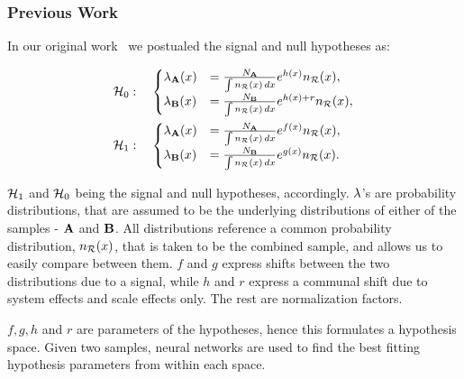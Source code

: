 \documentclass[../../ddppaper2.tex]{subfiles}
\begin{document}
\subsubsection{Previous Work}

In our original work~\cite{LastDDPPaper} we postualed the signal and null hypotheses as:

\begin{equation}
\begin{aligned}
    \nullhypothesis &: \quad
    \begin{cases}
        \pdf_{\dataset{A}}(\eventsymbol)
        &=
        \frac{N_{\dataset{A}}}
            {\int \refdist[\eventsymbol]\,d\eventsymbol}
        e^{h(\eventsymbol)} \refdist[\eventsymbol],
        \\
        \pdf_{\dataset{B}}(\eventsymbol)
        &=
        \frac{N_{\dataset{B}}}
            {\int \refdist[\eventsymbol]\,d\eventsymbol}
        e^{h(\eventsymbol)+r} \refdist[\eventsymbol],
    \end{cases} \\
    \hypothesis{1} &: \quad
    \begin{cases}
        \pdf_{\dataset{A}}(\eventsymbol)
        &=
        \frac{N_{\dataset{A}}}
            {\int \refdist[\eventsymbol]\,d\eventsymbol}
        e^{f(\eventsymbol)} \refdist[\eventsymbol],
        \\
        \pdf_{\dataset{B}}(\eventsymbol)
        &=
        \frac{N_{\dataset{B}}}
            {\int \refdist[\eventsymbol]\,d\eventsymbol}
        e^{g(\eventsymbol)} \refdist[\eventsymbol].
    \end{cases}
\end{aligned}
\end{equation}

$\hypothesis{1}$ and $\nullhypothesis$ being the signal and null hypotheses, accordingly. $\pdf$'s are probability distributions, that are assumed to be the underlying distributions of either of the samples - $\dataset{A}$ and $\dataset{B}$. All distributions reference a common probability distribution, $\refdist[\eventsymbol]$, that is taken to be the combined sample, and allows us to easily compare between them. $f$ and $g$ express shifts between the two distributions due to a signal, while $h$ and $r$ express a communal shift due to system effects and scale effects only. The rest are normalization factors.

$f, g, h$ and $r$ are parameters of the hypotheses, hence this formulates a hypothesis space. Given two samples, neural networks are used to find the best fitting hypothesis parameters from within each space.

\end{document}
